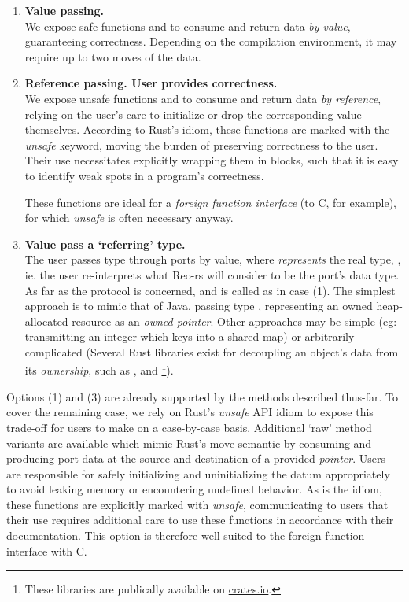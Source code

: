 \begin{enumerate}
	\item \textbf{Value passing.}\\
	We expose safe functions  and  to consume and return data \textit{by value}, guaranteeing correctness. Depending on the compilation environment, it may require up to two moves of the data.
	
	\item \textbf{Reference passing. User provides correctness.}\\
	We expose unsafe functions  and  to consume and return data \textit{by reference}, relying on the user's care to initialize or drop the corresponding value themselves. According to Rust's idiom, these functions are marked with the \textit{unsafe} keyword, moving the burden of preserving correctness to the user. Their use necessitates explicitly wrapping them in  blocks, such that it is easy to identify weak spots in a program's correctness.
	
	These functions are ideal for a \textit{foreign function interface} (to C, for example), for which \textit{unsafe} is often necessary anyway.
	
	\item \textbf{Value pass a `referring' type.}\\
	The user passes type  through ports by value, where  \textit{represents} the real type, , ie. the user re-interprets what Reo-rs will consider to be the port's data type. As far as the protocol is concerned,  and  is called as in case (1).
	The simplest approach is to mimic that of Java, passing type , representing an owned heap-allocated resource as an \textit{owned pointer}. Other approaches may be simple (eg: transmitting an integer which keys into a shared map) or arbitrarily complicated (Several Rust libraries exist for decoupling an object's data from its \textit{ownership}, such as ,  and \footnote{These libraries are publically available on \url{crates.io}.}). 
\end{enumerate}

Options (1) and (3) are already supported by the methods described thus-far. To cover the remaining case, we rely on Rust's \textit{unsafe} API idiom to expose this trade-off for users to make on a case-by-case basis. Additional `raw' method variants are available which mimic Rust's move semantic by consuming and producing port data at the source and destination of a provided \textit{pointer}. Users are responsible for safely initializing and uninitializing the datum appropriately to avoid leaking memory or encountering undefined behavior. As is the idiom, these functions are explicitly marked with \textit{unsafe}, communicating to users that their use requires additional care to use these functions in accordance with their documentation. This option is therefore well-suited to the foreign-function interface with C.

